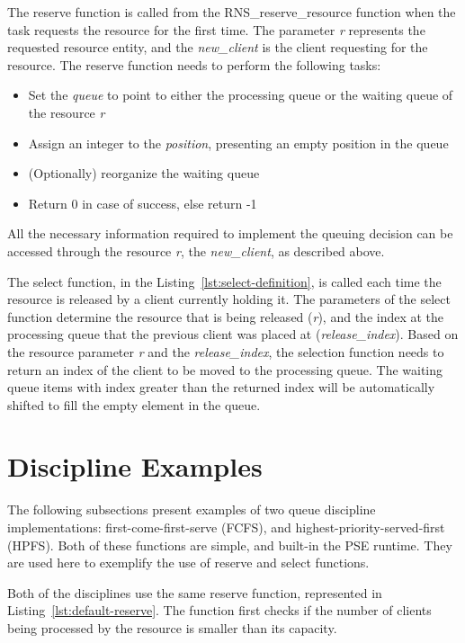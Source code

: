 The reserve function is called from the RNS\_reserve\_resource function when the task requests  the resource for the first time. The parameter \emph{r} represents the requested resource entity, and the \emph{new\_client} is the client requesting for the resource. The reserve function needs to perform the following tasks:

\begin{itemize}
\item Set the \emph{queue} to point to either the processing queue or the waiting queue of the resource \emph{r}
\item Assign an integer to the \emph{position}, presenting an empty position in the queue
\item (Optionally) reorganize the waiting queue
\item Return 0 in case of success, else return -1
\end{itemize}

All the necessary information required to implement the queuing decision can be accessed through the resource \emph{r}, the \emph{new\_client}, as described above.

The select function, in the Listing~\ref{lst:select-definition}, is called each time the resource is released by a client currently holding it. The parameters of the select function determine the resource that is being released (\emph{r}), and the index at the processing queue that the previous client was placed at (\emph{release\_index}). Based on the resource parameter \emph{r} and the \emph{release\_index}, the selection function needs to return an index of the client to be moved to the processing queue. The waiting queue items with index greater than the returned index will be automatically shifted to fill the empty element in the queue.



\section{Discipline Examples}
The following subsections present examples of two queue discipline implementations: first-come-first-serve (FCFS), and highest-priority-served-first (HPFS). Both of these functions are simple, and built-in the PSE runtime. They are used here to exemplify  the use of reserve and select functions.

Both of the disciplines use the same reserve function, represented in Listing~\ref{lst:default-reserve}. The function first checks if the number of clients being processed by the resource is smaller than its capacity.

